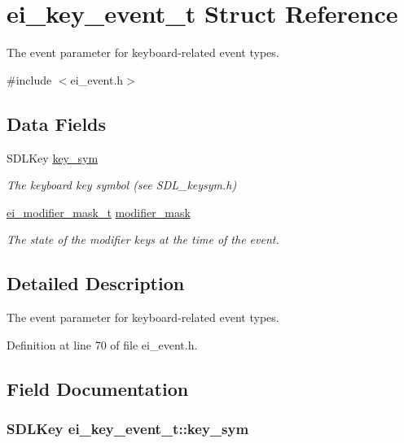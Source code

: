 \hypertarget{structei__key__event__t}{\section{ei\-\_\-key\-\_\-event\-\_\-t Struct Reference}
\label{structei__key__event__t}
}


The event parameter for keyboard-\/related event types.  




{\ttfamily \#include $<$ei\-\_\-event.\-h$>$}

\subsection*{Data Fields}
\begin{DoxyCompactItemize}
\item 
S\-D\-L\-Key \hyperlink{structei__key__event__t_a34be444e0f81bfa20e0b053779faf873}{key\-\_\-sym}
\begin{DoxyCompactList}\small\item\em The keyboard key symbol (see S\-D\-L\-\_\-keysym.\-h) \end{DoxyCompactList}\item 
\hyperlink{ei__event_8h_abcdd2ef0f39179463f17a06be9bdf949}{ei\-\_\-modifier\-\_\-mask\-\_\-t} \hyperlink{structei__key__event__t_a35e4dc6d788b9fdd4eeedf716662afab}{modifier\-\_\-mask}
\begin{DoxyCompactList}\small\item\em The state of the modifier keys at the time of the event. \end{DoxyCompactList}\end{DoxyCompactItemize}


\subsection{Detailed Description}
The event parameter for keyboard-\/related event types. 

Definition at line 70 of file ei\-\_\-event.\-h.



\subsection{Field Documentation}
\hypertarget{structei__key__event__t_a34be444e0f81bfa20e0b053779faf873}{
\subsubsection[{key\-\_\-sym}]{\setlength{\rightskip}{0pt plus 5cm}S\-D\-L\-Key ei\-\_\-key\-\_\-event\-\_\-t\-::key\-\_\-sym}}\label{structei__key__event__t_a34be444e0f81bfa20e0b053779faf873}


